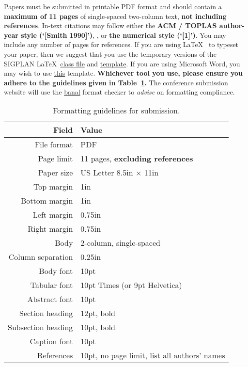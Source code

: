 \documentclass[pldi]{sigplanconf-pldi16}
\begin{document}
Papers must be submitted in printable PDF format and should contain a
\textbf{maximum of 11 pages} of single-spaced two-column text,
\textbf{not including references}.  In-text citations may follow either the
\textbf{ACM / TOPLAS author-year style (`[Smith 1990]')}, 
, or \textbf{the numerical style (`[1]')}.  You may include any number of pages for
references.  If you are using
\LaTeX~\cite{Lamport:94} to typeset your paper, then we suggest that
you use the temporary versions of the SIGPLAN 
\LaTeX~\href{https://github.com/emeryberger/PLDI-2016/blob/master/sigplanconf-pldi16.cls}{class
  file} and
\href{https://github.com/emeryberger/PLDI-2016/blob/master/pldi16-template.tex}{template}.
If you are using
Microsoft Word, you may wish to use
\href{http://conf.researchr.org/getImage/pldi2015/orig/pldi15-word-template.dot}{this}
template.  \textbf{Whichever tool you use, please ensure you adhere to the
guidelines given in Table~\ref{table:formatting}.}  The conference
submission website will use the
\href{https://www.usenix.org/legacy/event/wowcs08/tech/full_papers/voelker/voelker.pdf}{banal}
format checker to \emph{advise} on formatting compliance.

\begin{table}[t!]
  \centering
{  \sffamily\small %
  \begin{tabular}{rl}
    \textbf{Field} & \textbf{Value}\\
    \hline
    File format & PDF \\
    Page limit & 11 pages, \textbf{excluding references}\\
    Paper size & US Letter 8.5in $\times$ 11in\\
    Top margin & 1in\\
    Bottom margin & 1in\\
    Left margin & 0.75in\\
    Right margin & 0.75in\\
    Body & 2-column, single-spaced\\
    Column separation & 0.25in\\
    Body font & 10pt\\
    Tabular font & 10pt Times (or 9pt Helvetica)\\
    Abstract font & 10pt\\
    Section heading  & 12pt, bold\\
    Subsection heading  & 10pt, bold\\
    Caption font & 10pt\\
    References & 10pt, no page limit, list all authors' names\\
  \end{tabular}
}
  \caption{Formatting guidelines for submission. }
  \label{table:formatting}
\end{table}
\end{document}
